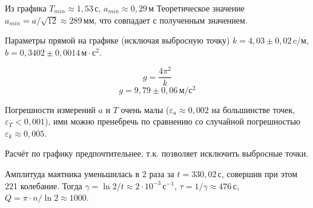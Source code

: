 Из графика $T_{min}\approx 1{,}53\,\text{с}$, $a_{min}\approx 0{,}29\,\text{м}$
Теоретическое значение $a_{min}=a/\sqrt{12}\approx 289\,\text{мм}$, что совпадает
с полученным значением.

Параметры прямой на графике (исключая выбросную точку) $k=4{,}03\pm 0{,}02\,\text{c}/\text{м}$, 
$b=0{,}3402\pm0{,}0014\,\text{м}\cdot\text{с}^2$.

\[g=\frac{4\pi^2}{k}\]
\[g=9{,}79\pm 0{,}06\,\text{м}/\text{с}^2\]

Погрешности измерений $a$ и $T$ очень малы ($\varepsilon_a\approx 0{,}002$
на большинстве точек, $\varepsilon_T < 0{,}001$), ими можно пренебречь по сравнению
со случайной погрешностью $\varepsilon_k\approx 0{,}005$.

Расчёт по графику предпочтительнее, т.к. позволяет исключить выбросные точки.

Амплитуда маятника уменьшилась в 2 раза за $t=330{,}02\,\text{с}$, совершив при этом
221 колебание. Тогда $\gamma=\ln 2/t\approx 2\cdot 10^{-3}\,\text{с}^{-1}$,
$\tau = 1/\gamma\approx 476\,\text{с}$, $Q=\pi\cdot n/\ln 2\approx 1000$.
